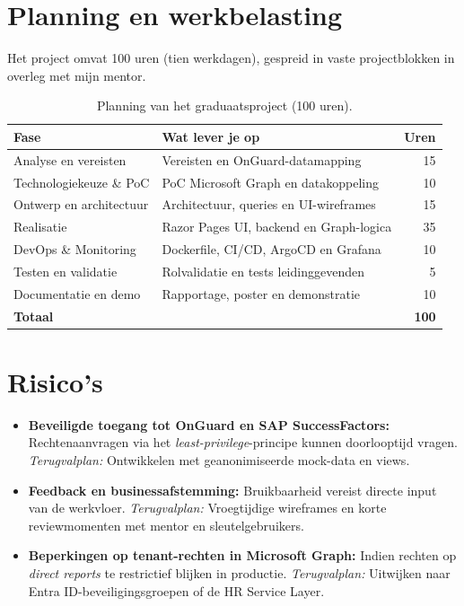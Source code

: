 \section{Planning en werkbelasting}%
\label{vst:planning}

Het project omvat 100 uren (tien werkdagen), gespreid in vaste projectblokken in overleg met mijn mentor.

\begin{table}[htbp]
  \centering
  \small
  \begin{tabular}{llr}
    \toprule
    \textbf{Fase} & \textbf{Wat lever je op} & \textbf{Uren} \\
    \midrule
    Analyse en vereisten      & Vereisten en OnGuard-datamapping        & 15  \\
    Technologiekeuze \& PoC   & PoC Microsoft Graph en datakoppeling    & 10  \\
    Ontwerp en architectuur   & Architectuur, queries en UI-wireframes  & 15  \\
    Realisatie                & Razor Pages UI, backend en Graph-logica & 35  \\
    DevOps \& Monitoring      & Dockerfile, CI/CD, ArgoCD en Grafana    & 10  \\
    Testen en validatie       & Rolvalidatie en tests leidinggevenden   & 5   \\
    Documentatie en demo      & Rapportage, poster en demonstratie      & 10  \\
    \midrule
    \textbf{Totaal}           &                                         & \textbf{100} \\
    \bottomrule
  \end{tabular}
  \caption[Planning en werkbelasting]{\label{tab:vst-planning}%
    Planning van het graduaatsproject (100 uren).}
\end{table}


\section{Risico's}%
\label{vst:risicos}

\begin{itemize}
    \item \textbf{Beveiligde toegang tot OnGuard en SAP SuccessFactors:} Rechtenaanvragen via het \emph{least-privilege}-principe kunnen doorlooptijd vragen. \emph{Terugvalplan:} Ontwikkelen met geanonimiseerde mock-data en views.
    \item \textbf{Feedback en businessafstemming:} Bruikbaarheid vereist directe input van de werkvloer. \emph{Terugvalplan:} Vroegtijdige wireframes en korte reviewmomenten met mentor en sleutelgebruikers.
    \item \textbf{Beperkingen op tenant-rechten in Microsoft Graph:} Indien rechten op \emph{direct reports} te restrictief blijken in productie. \emph{Terugvalplan:} Uitwijken naar Entra ID-beveiligingsgroepen of de HR Service Layer.
\end{itemize}